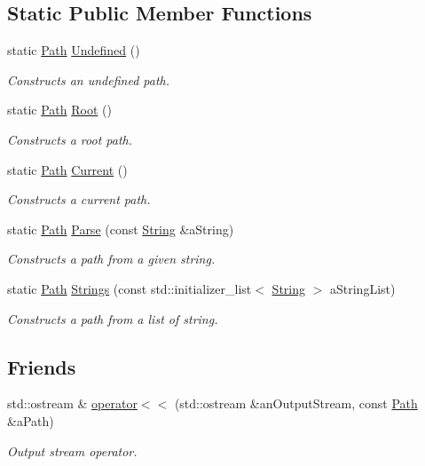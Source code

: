 \subsection*{Static Public Member Functions}
\begin{DoxyCompactItemize}
\item 
static \hyperlink{classostk_1_1core_1_1fs_1_1_path}{Path} \hyperlink{classostk_1_1core_1_1fs_1_1_path_a45846b79575fae6e5a7384c06e7c000c}{Undefined} ()
\begin{DoxyCompactList}\small\item\em Constructs an undefined path. \end{DoxyCompactList}\item 
static \hyperlink{classostk_1_1core_1_1fs_1_1_path}{Path} \hyperlink{classostk_1_1core_1_1fs_1_1_path_a79d34bce7de624ac851c29e59361a8e1}{Root} ()
\begin{DoxyCompactList}\small\item\em Constructs a root path. \end{DoxyCompactList}\item 
static \hyperlink{classostk_1_1core_1_1fs_1_1_path}{Path} \hyperlink{classostk_1_1core_1_1fs_1_1_path_a6a8f1a3d8a52c0dd4fd885ed4dae351a}{Current} ()
\begin{DoxyCompactList}\small\item\em Constructs a current path. \end{DoxyCompactList}\item 
static \hyperlink{classostk_1_1core_1_1fs_1_1_path}{Path} \hyperlink{classostk_1_1core_1_1fs_1_1_path_ad08539ba654f5df11c4bcb07276345ad}{Parse} (const \hyperlink{classostk_1_1core_1_1types_1_1_string}{String} \&a\+String)
\begin{DoxyCompactList}\small\item\em Constructs a path from a given string. \end{DoxyCompactList}\item 
static \hyperlink{classostk_1_1core_1_1fs_1_1_path}{Path} \hyperlink{classostk_1_1core_1_1fs_1_1_path_a344d49d5962f0cdd908d898ed329224f}{Strings} (const std\+::initializer\+\_\+list$<$ \hyperlink{classostk_1_1core_1_1types_1_1_string}{String} $>$ a\+String\+List)
\begin{DoxyCompactList}\small\item\em Constructs a path from a list of string. \end{DoxyCompactList}\end{DoxyCompactItemize}
\subsection*{Friends}
\begin{DoxyCompactItemize}
\item 
std\+::ostream \& \hyperlink{classostk_1_1core_1_1fs_1_1_path_a87813ac3ede0b43b50ae6b9fdf0a2815}{operator$<$$<$} (std\+::ostream \&an\+Output\+Stream, const \hyperlink{classostk_1_1core_1_1fs_1_1_path}{Path} \&a\+Path)
\begin{DoxyCompactList}\small\item\em Output stream operator. \end{DoxyCompactList}\end{DoxyCompactItemize}


